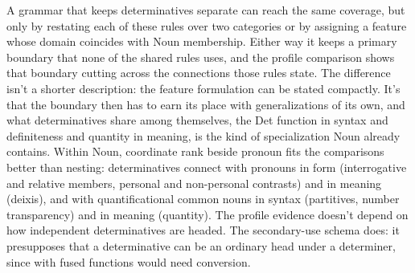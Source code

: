 \documentclass[12pt]{article}
\begin{document}
A grammar that keeps determinatives separate can reach the same coverage, but only by restating each of these rules over two categories or by assigning a feature whose domain coincides with Noun membership. Either way it keeps a primary boundary that none of the shared rules uses, and the profile comparison shows that boundary cutting across the connections those rules state. The difference isn't a shorter description: the feature formulation can be stated compactly. It's that the boundary then has to earn its place with generalizations of its own, and what determinatives share among themselves, the Det function in syntax and definiteness and quantity in meaning, is the kind of specialization Noun already contains.
Within Noun, coordinate rank beside pronoun fits the comparisons better than nesting: determinatives connect with pronouns in form (interrogative and relative members, personal and non-personal contrasts) and in meaning (deixis), and with quantificational common nouns in syntax (partitives, number transparency) and in meaning (quantity). The profile evidence doesn't depend on how independent determinatives are headed. The secondary-use schema does: it presupposes that a determinative can be an ordinary head under a determiner, since with fused functions  would need conversion.

\clearpage
\printbibliography
\end{document}
